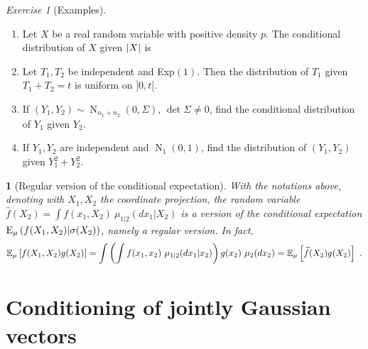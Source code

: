 \documentclass[12pt,a4paper]{amsart}
\newcommand{\gaussian}[3]{\operatorname{N}_{#1}\left(#2,#3\right)}
\theoremstyle{plain}%
\newtheorem{npar}{}%
\theoremstyle{definition}
\theoremstyle{remark}
\newtheorem{exercise}{Exercise}
\begin{document}
\begin{exercise}[Examples]\ 
  \begin{enumerate}
\item Let $X$ be a real random variable with positive density $p$. The conditional distribution of $X$ given $\left\vert X\right\vert$ is 
  \item Let $T_1,T_2$ be independent and Exp$(1)$. Then the distribution of $T_1$ given $T_1+T_2=t$ is uniform on $]0,t[$.
  \item If $(Y_1,Y_2) \sim \gaussian {n_1+n_2} 0 \Sigma$, $\det \Sigma \ne 0$, find the conditional distribution of $Y_1$ given $Y_2$.
  \item If $Y_1,Y_2$ are independent and $\gaussian {1} 0 1$, find the distribution of $(Y_1,Y_2)$ given $Y_1^2 + Y_2^2$. 
  \end{enumerate}
\end{exercise}

\begin{npar}[Regular version of the conditional expectation] With the notations above, denoting with $X_1,X_2$ the coordinate projection, the random variable $\widehat f(X_2) = \int f(x_1,X_2) \ \mu_{1|2}(dx_1|X_2)$ is a version of the conditional expectation $\operatorname{E}_{\mu}\left(f(X_1,X_2) \middle| \sigma(X_2)\right)$, namely a \emph{regular version}. In fact,
  \begin{equation*}
    \operatorname{\mathbb E}_{\mu}\left[f(X_1,X_2)g(X_2)\right] = \int \left(\int f(x_1,x_2) \ \mu_{1|2}(dx_1|x_2)\right)g(x_2) \ \mu_2(dx_2) = \operatorname{\mathbb E}_{\mu}\left[\widehat f(X_2)g(X_2)\right] \ .
  \end{equation*}
\end{npar}

\section{Conditioning of jointly Gaussian vectors}
\label{sec:cond-jointly-gauss}
\end{document}
